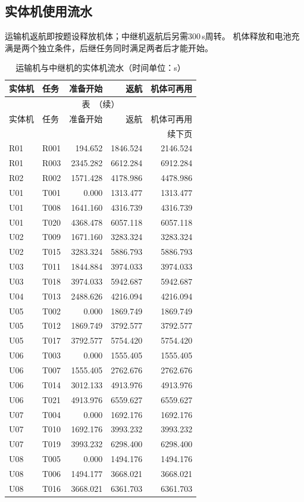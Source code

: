 \subsection{实体机使用流水}
运输机返航即按题设释放机体；中继机返航后另需300\,s周转。
机体释放和电池充满是两个独立条件，后继任务同时满足两者后才能开始。
\begingroup
\small
\setlength{\tabcolsep}{3pt}
\renewcommand{\arraystretch}{1.10}
\begin{longtable}{@{}llrrr@{}}
\caption{运输机与中继机的实体机流水（时间单位：s）}\label{tab:q3-units}\\
\toprule
实体机 & 任务 & 准备开始 & 返航 & 机体可再用 \\
\midrule
\endfirsthead
\multicolumn{5}{c}{\small 表~\thetable{}（续）}\\
\toprule
实体机 & 任务 & 准备开始 & 返航 & 机体可再用 \\
\midrule
\endhead
\midrule
\multicolumn{5}{r}{\small 续下页}\\
\endfoot
\bottomrule
\endlastfoot
R01 & R001 & 194.652 & 1846.524 & 2146.524 \\
R01 & R003 & 2345.282 & 6612.284 & 6912.284 \\
R02 & R002 & 1571.428 & 4178.986 & 4478.986 \\
U01 & T001 & 0.000 & 1313.477 & 1313.477 \\
U01 & T008 & 1641.160 & 4316.739 & 4316.739 \\
U01 & T020 & 4368.478 & 6057.118 & 6057.118 \\
U02 & T009 & 1671.160 & 3283.324 & 3283.324 \\
U02 & T015 & 3283.324 & 5886.793 & 5886.793 \\
U03 & T011 & 1844.884 & 3974.033 & 3974.033 \\
U03 & T018 & 3974.033 & 5942.687 & 5942.687 \\
U04 & T013 & 2488.626 & 4216.094 & 4216.094 \\
U05 & T002 & 0.000 & 1869.749 & 1869.749 \\
U05 & T012 & 1869.749 & 3792.577 & 3792.577 \\
U05 & T017 & 3792.577 & 5754.420 & 5754.420 \\
U06 & T003 & 0.000 & 1555.405 & 1555.405 \\
U06 & T007 & 1555.405 & 2762.676 & 2762.676 \\
U06 & T014 & 3012.133 & 4913.976 & 4913.976 \\
U06 & T021 & 4913.976 & 6559.627 & 6559.627 \\
U07 & T004 & 0.000 & 1692.176 & 1692.176 \\
U07 & T010 & 1692.176 & 3993.232 & 3993.232 \\
U07 & T019 & 3993.232 & 6298.400 & 6298.400 \\
U08 & T005 & 0.000 & 1494.176 & 1494.176 \\
U08 & T006 & 1494.177 & 3668.021 & 3668.021 \\
U08 & T016 & 3668.021 & 6361.703 & 6361.703 \\
\end{longtable}
\endgroup


